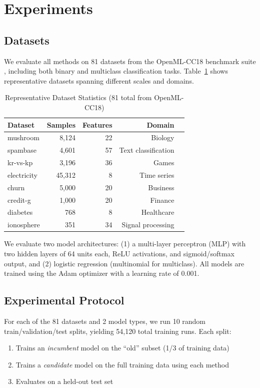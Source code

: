 \documentclass[12pt, letterpaper]{article}
\theoremstyle{remark}
\begin{document}
\section{Experiments}

\subsection{Datasets}

We evaluate all methods on 81 datasets from the OpenML-CC18 benchmark suite \citep{bischl2021openml}, including both binary and multiclass classification tasks. Table~\ref{tab:datasets} shows representative datasets spanning different scales and domains.

\begin{table}[!htb]
\centering
\caption{Representative Dataset Statistics (81 total from OpenML-CC18)}
\label{tab:datasets}
\begin{tabular}{lrrrl}
\toprule
Dataset & Samples & Features & Domain \\
\midrule
mushroom & 8,124 & 22 & Biology \\
spambase & 4,601 & 57 & Text classification \\
kr-vs-kp & 3,196 & 36 & Games \\
electricity & 45,312 & 8 & Time series \\
churn & 5,000 & 20 & Business \\
credit-g & 1,000 & 20 & Finance \\
diabetes & 768 & 8 & Healthcare \\
ionosphere & 351 & 34 & Signal processing \\
\bottomrule
\end{tabular}
\end{table}

We evaluate two model architectures: (1) a multi-layer perceptron (MLP) with two hidden layers of 64 units each, ReLU activations, and sigmoid/softmax output, and (2) logistic regression (multinomial for multiclass). All models are trained using the Adam optimizer with a learning rate of 0.001.

\subsection{Experimental Protocol}

For each of the 81 datasets and 2 model types, we run 10 random train/validation/test splits, yielding 54,120 total training runs. Each split:
\begin{enumerate}
\item Trains an \emph{incumbent} model on the ``old'' subset (1/3 of training data)
\item Trains a \emph{candidate} model on the full training data using each method
\item Evaluates on a held-out test set
\end{enumerate}
\end{document}
